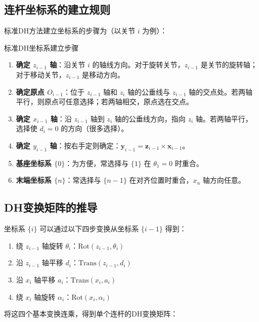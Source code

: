 \subsection{连杆坐标系的建立规则}

标准DH方法建立坐标系的步骤为（以关节 $i$ 为例）：

\begin{myalgorithm}{标准DH坐标系建立步骤}
\begin{enumerate}
    \item \textbf{确定 $z_{i-1}$ 轴}：沿关节 $i$ 的轴线方向。对于旋转关节，$z_{i-1}$ 是关节的旋转轴；对于移动关节，$z_{i-1}$ 是移动方向。
    \item \textbf{确定原点 $O_{i-1}$}：位于 $z_{i-1}$ 轴和 $z_i$ 轴的公垂线与 $z_{i-1}$ 轴的交点处。若两轴平行，则原点可任意选择；若两轴相交，原点选在交点。
    \item \textbf{确定 $x_{i-1}$ 轴}：沿 $z_{i-1}$ 轴到 $z_i$ 轴的公垂线方向，指向 $z_i$ 轴。若两轴平行，选择使 $d_i = 0$ 的方向（很多选择）。
    \item \textbf{确定 $y_{i-1}$ 轴}：按右手定则确定：$\mathbf{y}_{i-1} = \mathbf{z}_{i-1} \times \mathbf{x}_{i-1}$。
    \item \textbf{基座坐标系 $\{0\}$}：为方便，常选择与 $\{1\}$ 在 $\theta_1 = 0$ 时重合。
    \item \textbf{末端坐标系 $\{n\}$}：常选择与 $\{n-1\}$ 在对齐位置时重合，$x_n$ 轴方向任意。
\end{enumerate}
\end{myalgorithm}

\subsection{DH变换矩阵的推导}

坐标系 $\{i\}$ 可以通过以下四步变换从坐标系 $\{i-1\}$ 得到：

\begin{enumerate}
    \item 绕 $z_{i-1}$ 轴旋转 $\theta_i$：$\mathrm{Rot}(z_{i-1}, \theta_i)$
    \item 沿 $z_{i-1}$ 轴平移 $d_i$：$\mathrm{Trans}(z_{i-1}, d_i)$
    \item 沿 $x_i$ 轴平移 $a_i$：$\mathrm{Trans}(x_i, a_i)$
    \item 绕 $x_i$ 轴旋转 $\alpha_i$：$\mathrm{Rot}(x_i, \alpha_i)$
\end{enumerate}

将这四个基本变换连乘，得到单个连杆的DH变换矩阵：

